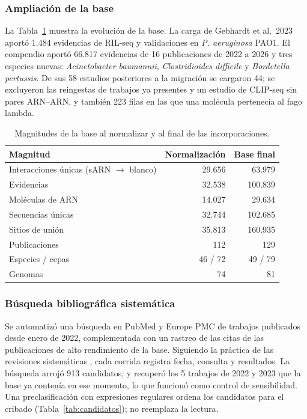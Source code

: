 \documentclass[11pt,a4paper]{article}
\begin{document}
\subsubsection{Ampliación de la base}

La Tabla~\ref{tab:ampliacion} muestra la evolución de la base. La carga de Gebhardt et al.\ 2023 aportó 1.484 evidencias de RIL-seq y validaciones en \emph{P. aeruginosa} PAO1. El compendio aportó 66.817 evidencias de 16 publicaciones de 2022 a 2026 y tres especies nuevas: \emph{Acinetobacter baumannii}, \emph{Clostridioides difficile} y \emph{Bordetella pertussis}. De sus 58 estudios posteriores a la migración se cargaron 44; se excluyeron las reingestas de trabajos ya presentes y un estudio de CLIP-seq sin pares ARN--ARN, y también 223 filas en las que una molécula pertenecía al fago lambda.

\begin{table}[htbp]
\centering\small
\caption{Magnitudes de la base al normalizar y al final de las incorporaciones.}
\label{tab:ampliacion}
\begin{tabular}{l r r}
\toprule
Magnitud & Normalización & Base final\\
\midrule
Interacciones únicas (sARN $\rightarrow$ blanco) & 29.656 & 63.979\\
Evidencias & 32.538 & 100.839\\
Moléculas de ARN & 14.027 & 29.634\\
Secuencias únicas & 32.744 & 102.685\\
Sitios de unión & 35.813 & 160.935\\
Publicaciones & 112 & 129\\
Especies / cepas & 46 / 72 & 49 / 79\\
Genomas & 74 & 81\\
\bottomrule
\end{tabular}
\end{table}

\subsubsection{Búsqueda bibliográfica sistemática}

Se automatizó una búsqueda en PubMed y Europe PMC de trabajos publicados desde enero de 2022, complementada con un rastreo de las citas de las publicaciones de alto rendimiento de la base. Siguiendo la práctica de las revisiones sistemáticas \cite{page2021}, cada corrida registra fecha, consulta y resultados. La búsqueda arrojó 913 candidatos, y recuperó los 5 trabajos de 2022 y 2023 que la base ya contenía en ese momento, lo que funcionó como control de sensibilidad. Una preclasificación con expresiones regulares ordena los candidatos para el cribado (Tabla~\ref{tab:candidatos}); no reemplaza la lectura.
\end{document}
